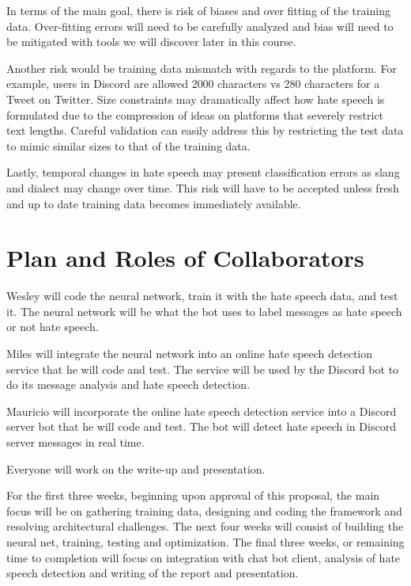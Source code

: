 \documentclass[conference]{sig-alternate-05-2015}
\begin{document}
In terms of the main goal, there is risk of biases and over fitting of the training data.  Over-fitting errors will need to be carefully analyzed and bias will need to be mitigated with tools we will discover later in this course.

Another risk would be training data mismatch with regards to the platform.  For example, users in Discord are allowed 2000 characters vs 280 characters for a Tweet on Twitter.  Size constraints may dramatically affect how hate speech is formulated due to the compression of ideas on platforms that severely restrict text lengths.  Careful validation can easily address this by restricting the test data to mimic similar sizes to that of the training data.

Lastly, temporal changes in hate speech may present classification errors as slang and dialect may change over time.  This risk will have to be accepted unless fresh and up to date training data becomes immediately available.

\section{Plan and Roles of Collaborators}

Wesley will code the neural network, train it with the hate speech data, and test it. The neural network will be what the bot uses to label messages as hate speech or not hate speech.

Miles will integrate the neural network into an online hate speech detection service that he will code and test. The service will be used by the Discord bot to do its message analysis and hate speech detection. 

Mauricio will incorporate the online hate speech detection service into a Discord server bot that he will code and test. The bot will detect hate speech in Discord server messages in real time.

Everyone will work on the write-up and presentation.

For the first three weeks, beginning upon approval of this proposal, the main focus will be on gathering training data, designing and coding the framework and resolving architectural challenges.  The next four weeks will consist of building the neural net, training, testing and optimization.  The final three weeks, or remaining time to completion will focus on integration with chat bot client, analysis of hate speech detection and writing of the report and presentation.



\end{document}
